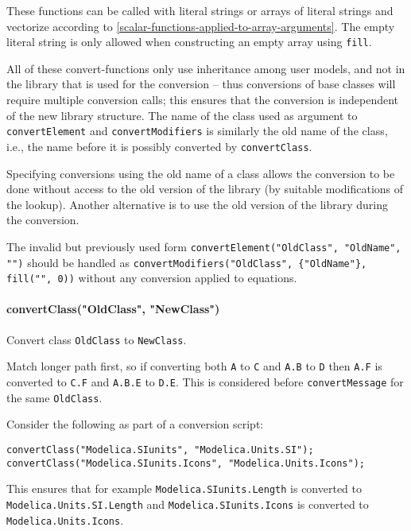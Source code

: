 These functions can be called with literal strings or arrays of literal strings and vectorize according to \cref{scalar-functions-applied-to-array-arguments}.
The empty literal string is only allowed when constructing an empty array using \lstinline!fill!.

All of these convert-functions only use inheritance among user models, and not in the library that is used for the conversion -- thus conversions of base classes will require multiple conversion calls; this ensures that the conversion is independent of the new library structure.
The name of the class used as argument to \lstinline!convertElement! and \lstinline!convertModifiers! is similarly the old name of the class, i.e., the name before it is possibly converted by \lstinline!convertClass!.

\begin{nonnormative}
Specifying conversions using the old name of a class allows the conversion to be done without access to the old version of the library (by suitable modifications of the lookup).
Another alternative is to use the old version of the library during the conversion.

The invalid but previously used form \lstinline!convertElement("OldClass", "OldName", "")! should be handled as \lstinline!convertModifiers("OldClass", {"OldName"}, fill("", 0))! without any conversion applied to equations.
\end{nonnormative}

\paragraph*{convertClass("OldClass", "NewClass")}\label{convertclassoldclassnewclass}

Convert class \lstinline!OldClass! to \lstinline!NewClass!.

Match longer path first, so if converting both \lstinline!A! to \lstinline!C! and \lstinline!A.B! to \lstinline!D! then \lstinline!A.F! is converted to \lstinline!C.F! and \lstinline!A.B.E! to \lstinline!D.E!.
This is considered before \lstinline!convertMessage! for the same \lstinline!OldClass!.

\begin{example}
Consider the following as part of a conversion script:
\begin{lstlisting}[language=modelica]
convertClass("Modelica.SIunits", "Modelica.Units.SI");
convertClass("Modelica.SIunits.Icons", "Modelica.Units.Icons");
\end{lstlisting}
This ensures that for example \lstinline!Modelica.SIunits.Length! is converted to \lstinline!Modelica.Units.SI.Length! and \lstinline!Modelica.SIunits.Icons! is converted to \lstinline!Modelica.Units.Icons!.
\end{example}


